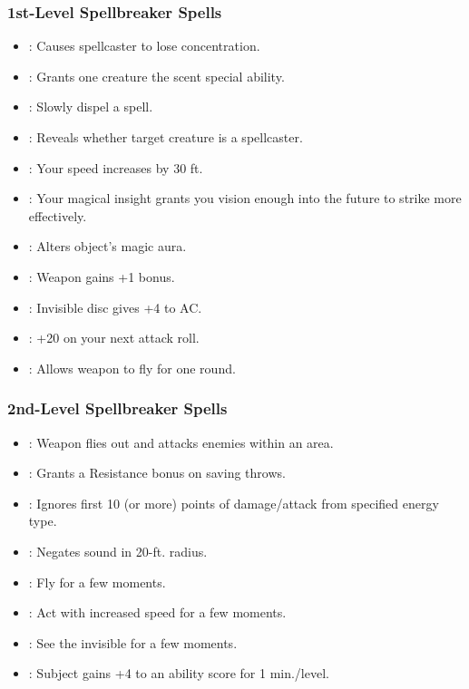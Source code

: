 \subsubsection{1st-Level Spellbreaker Spells}
\begin{itemize}
  \item {}: Causes spellcaster to lose concentration.
  \item {}: Grants one creature the scent special ability.
  \item {}: Slowly dispel a spell.
  \item {}: Reveals whether target creature is a spellcaster.
  \item {}: Your speed increases by 30 ft.
  \item {}: Your magical insight grants you vision enough into the future to strike more effectively.
  \item {}: Alters object's magic aura.
  \item {}: Weapon gains +1 bonus.
  \item {}: Invisible disc gives +4 to AC.
  \item {}: +20 on your next attack roll.
  \item {}: Allows weapon to fly for one round.
\end{itemize}
\subsubsection{2nd-Level Spellbreaker Spells}
\begin{itemize}
  \item {}: Weapon flies out and attacks enemies within an area.
  \item {} : Grants a Resistance bonus on saving throws.
  \item {}: Ignores first 10 (or more) points of damage/attack from specified energy type.
  \item {}: Negates sound in 20-ft. radius.
  \item {}: Fly for a few moments.
  \item {}: Act with increased speed for a few moments.
  \item {}: See the invisible for a few moments.
  \item {}: Subject gains +4 to an ability score for 1 min./level.
\end{itemize}
